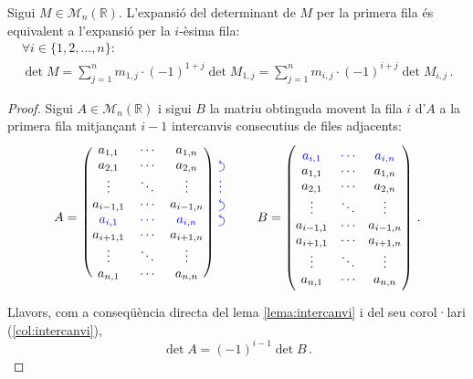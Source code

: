 \begin{s-lema}\label{lema:iesimafila}
	Sigui $M\in\mathcal{M}_n(\mathbb{R})$. L'expansió del determinant de $M$ per la primera fila és equivalent a l'expansió per la $i$-èsima fila:
	\begin{multline*}
	\forall i \in \{1,2,\ldots, n\}:\\
	\det M = \sum_{j=1}^{n} m_{1,j}\cdot(-1)^{1+j}\det M_{1,j} = \sum_{j=1}^{n} m_{i,j}\cdot(-1)^{i+j}\det M_{i,j}\,.
	\end{multline*}
	\begin{proof}
		Sigui $A\in\mathcal{M}_n(\mathbb{R})$ i sigui $B$ la matriu obtinguda movent la fila $i$ d'$A$ a la primera fila mitjançant $i-1$ intercanvis consecutius de files adjacents:
		\[
		A =\
		\begin{blockarray}{cccc}
		\begin{block}{(ccc)*{1}{>{\color{blue}}l<{}}}
		a_{1,1}&	\cdots&		a_{1,n}& 		\\
		a_{2,1}&	\cdots&		a_{2,n}& 		\ucarr\\
		\vdots&		\ddots&		\vdots& 		\vdots\\
		a_{i-1,1}&	\cdots&		a_{i-1,n}&    	\ucarr \\
		\bl a_{i,1}&\bl\cdots&	\bl a_{i,n}&    \ucarr \\
		a_{i+1,1}&	\cdots&		a_{i+1,n}&    	\\
		\vdots&		\ddots&		\vdots& 		\\
		a_{n,1}&	\cdots&		a_{n,n}& 		\\	
		\end{block}
		\end{blockarray}
		\qquad
		B =
		\begin{pmatrix}
		\bl a_{i,1}&\bl\cdots&	\bl a_{i,n}\\
		a_{1,1}&	\cdots&		a_{1,n}\\
		a_{2,1}&	\cdots&		a_{2,n}\\
		\vdots&		\ddots&		\vdots\\
		a_{i-1,1}&	\cdots&		a_{i-1,n}\\
		a_{i+1,1}&	\cdots&		a_{i+1,n}\\
		\vdots&		\ddots&		\vdots\\
		a_{n,1}&	\cdots&		a_{n,n}\\
		\end{pmatrix}\,.
		\]
		Llavors, com a conseqüència directa del lema \ref{lema:intercanvi} i del seu corol·lari (\ref{col:intercanvi}), 
		\begin{equation}\label{eq:detrel}
		\det A = (-1)^{i-1}\det B\,.
		\end{equation}
		

\end{proof}
\end{s-lema}
